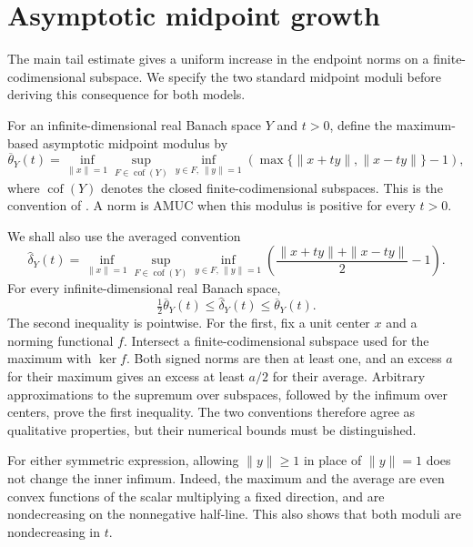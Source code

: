 \section{Asymptotic midpoint growth}\label{sec:consequences}

The main tail estimate gives a uniform increase in the endpoint norms
on a finite-codimensional subspace. We specify the two standard
midpoint moduli before deriving this consequence for both models.

For an infinite-dimensional real Banach space $Y$ and $t>0$, define
the maximum-based asymptotic midpoint modulus by
\begin{equation}\label{eq:max-modulus}
 \overline\theta_Y(t)=\inf_{\|x\|=1}
 \sup_{F\in\operatorname{cof}(Y)}
 \inf_{y\in F,\,\|y\|=1}
 \left(\max\{\|x+ty\|,\|x-ty\|\}-1\right),
\end{equation}
where $\operatorname{cof}(Y)$ denotes the closed finite-codimensional
subspaces. This is the convention of \cite[Definition~2.2]{DKRRZ2016}.
A norm is AMUC when this modulus is positive for every $t>0$.

We shall also use the averaged convention
\begin{equation}\label{eq:averaged-modulus}
 \widehat\delta_Y(t)=\inf_{\|x\|=1}\sup_{F\in\operatorname{cof}(Y)}
 \inf_{y\in F,\,\|y\|=1}
 \left(\frac{\|x+ty\|+\|x-ty\|}{2}-1\right).
\end{equation}
For every infinite-dimensional real Banach space,
\begin{equation}\label{eq:modulus-comparison}
 \tfrac12\overline\theta_Y(t)\le\widehat\delta_Y(t)
 \le\overline\theta_Y(t).
\end{equation}
The second inequality is pointwise. For the first, fix a unit center
$x$ and a norming functional $f$. Intersect a finite-codimensional
subspace used for the maximum with $\ker f$. Both signed norms are then
at least one, and an excess $a$ for their maximum gives an excess at
least $a/2$ for their average. Arbitrary approximations to the supremum
over subspaces, followed by the infimum over centers, prove the first
inequality. The two conventions therefore agree as qualitative
properties, but their numerical bounds must be distinguished.

For either symmetric expression, allowing $\|y\|\ge1$ in place of
$\|y\|=1$ does not change the inner infimum. Indeed, the maximum and
the average are even convex functions of the scalar multiplying a fixed
direction, and are nondecreasing on the nonnegative half-line. This also
shows that both moduli are nondecreasing in $t$.

